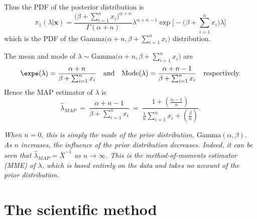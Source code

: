\begin{solution}
Thus the PDF of the posterior distribution is 
\[
\pi_1(\lambda|\mathbf{x})	
	= \frac{\big(\beta+\sum_{i=1}^n x_i\big)^{\alpha+n}}{\Gamma(\alpha+n)}
	\lambda^{\alpha+n-1}\exp\Big[-\big(\beta+\sum_{i=1}^n x_i\big)\lambda\Big]
\]
which is the PDF of the $\text{Gamma}\Big(\alpha+n,\beta+\sum_{i=1}^n x_i\Big)$ distribution.


The mean and mode of $\lambda\sim\text{Gamma}\Big(\alpha+n,\beta+\sum_{i=1}^n x_i\Big)$ are
\[
\expe(\lambda) = \frac{\alpha+n}{\beta+\sum_{i=1}^n x_i}
\text{\quad and\quad}
\text{Mode}(\lambda) = \frac{\alpha+n-1}{\beta+\sum_{i=1}^n x_i}
\text{\quad respectively.}
\]
Hence the MAP estimator of $\lambda$ is
\[
\hat{\lambda}_{MAP} 
	\ =\ \frac{\alpha+n-1}{\beta+\sum_{i=1}^n x_i}
	\ =\ \frac{1 + \left(\frac{\alpha-1}{n}\right)}{\frac{1}{n}\sum_{i=1}^n x_i + \left(\frac{\beta}{n}\right)}.
\]

\bit
\it When $n=0$, this is simply the mode of the prior distribution, $\text{Gamma}(\alpha,\beta)$.
\it As $n$ increases, the influence of the prior distribution decreases.
\it Indeed, it can be seen that $\hat{\lambda}_{MAP}=\bar{X}^{-1}$ as $n\to\infty$.
\it This is the method-of-moments estimator (MME) of $\lambda$, which is based entirely on the data and takes no account of the prior distribution.
\eit
\end{solution}


\section{The scientific method}

